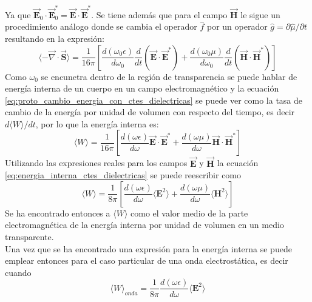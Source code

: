 \documentclass[../tesis_main_file.tex]{subfiles}
\begin{document}
Ya que $\overrightarrow{\textbf{E}}_0\cdot \overrightarrow{\textbf{E}}_0^* = \overrightarrow{\textbf{E}}\cdot \overrightarrow{\textbf{E}}^*$. Se tiene además que para el campo $\overrightarrow{\textbf{H}}$ le sigue un procedimiento análogo donde se cambia el operador $\widehat{f}$ por un operador $\widehat{g}=\partial \widehat{\mu}/\partial t$ resultando en la expresión: 
\begin{equation}
\label{eq:proto_cambio_energia_con_ctes_dielectricas}\langle-\overrightarrow{\nabla} \cdot \overrightarrow{\textbf{S}}\rangle = \frac{1}{16\pi}\left[\frac{d(\omega_0 \epsilon)}{d\omega_0}\frac{d}{dt}\left(\overrightarrow{\textbf{E}}\cdot \overrightarrow{\textbf{E}}^*\right) + \frac{d(\omega_0 \mu)}{d\omega_0}\frac{d}{dt}\left(\overrightarrow{\textbf{H}}\cdot \overrightarrow{\textbf{H}}^*\right)\right]
\end{equation}
Como $\omega_0$ se encunetra dentro de la región de transparencia se puede hablar de energía interna de un cuerpo en un campo electromagnético y la ecuación \ref{eq:proto_cambio_energia_con_ctes_dielectricas} se puede ver como la tasa de cambio de la energía por unidad de volumen con respecto del tiempo, es decir $d\langle W \rangle/dt$, por lo que la energía interna es:
\begin{equation}
\label{eq:energia_interna_ctes_dielectricas}
\langle W \rangle=\frac{1}{16\pi}\left[\frac{d(\omega \epsilon)}{d\omega}\overrightarrow{\textbf{E}}\cdot \overrightarrow{\textbf{E}}^* + \frac{d(\omega \mu )}{d\omega}\overrightarrow{\textbf{H}}\cdot \overrightarrow{\textbf{H}}^*\right]
\end{equation}
Utilizando las expresiones reales para los campos $\overrightarrow{\textbf{E}}$ y $\overrightarrow{\textbf{H}}$ la ecuación \ref{eq:energia_interna_ctes_dielectricas} se puede reescribir como
\begin{equation}
\label{eq:energia_interna_electro_promedio_real}
\langle W \rangle=\frac{1}{8\pi}\left[\frac{d(\omega \epsilon)}{d\omega}\langle\textbf{E}^2\rangle + \frac{d(\omega \mu )}{d\omega}\langle\textbf{H}^2\rangle\right]
\end{equation}
Se ha encontrado entonces a $\langle W \rangle$ como el valor medio de la parte electromagnética de la energía interna por unidad de volumen en un medio transparente.\\
Una vez que se ha encontrado una expresión para la energía interna se puede emplear entonces para el caso particular de una onda electrostática, es decir cuando
\begin{equation}
\langle W \rangle_{onda}= \frac{1}{8\pi}\frac{d(\omega \epsilon)}{d\omega}\langle\textbf{E}^2\rangle
\end{equation}
\end{document}
